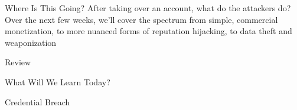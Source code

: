 \documentclass[nobackground,dvipsnames,table]{beamer}
\begin{document}
\begin{frame}{Where Is This Going?}
    After taking over an account, what do the attackers do?\\
    Over the next few weeks, we’ll cover the spectrum from simple, commercial monetization, to more nuanced forms of reputation hijacking, to data theft and weaponization
\end{frame}

\begin{frame}{Review}
    
\end{frame}

\begin{frame}{}
    
\end{frame}

\begin{frame}{What Will We Learn Today?}
    
\end{frame}

\begin{frame}{Credential Breach}
    
\end{frame}


\backpage
\end{document}

